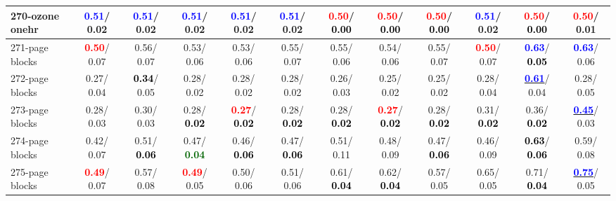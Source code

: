 \begin{table}[h]
\begin{center}
{\begin{tabular}{lc|c|c|c|c|c|c|c|c|c|c}
270-ozone onehr & \textcolor{blue}{\textbf{  0.51}}/  0.02 & \textcolor{blue}{\textbf{  0.51}}/  0.02 & \textcolor{blue}{\textbf{  0.51}}/  0.02 & \textcolor{blue}{\textbf{  0.51}}/  0.02 & \textcolor{blue}{\textbf{  0.51}}/  0.02 & \textcolor{red}{\textbf{  0.50}}/\textcolor{black}{\textbf{  0.00}} & \textcolor{red}{\textbf{  0.50}}/\textcolor{black}{\textbf{  0.00}} & \textcolor{red}{\textbf{  0.50}}/\textcolor{black}{\textbf{  0.00}} & \textcolor{blue}{\textbf{  0.51}}/  0.02 & \textcolor{red}{\textbf{  0.50}}/\textcolor{black}{\textbf{  0.00}} & \textcolor{red}{\textbf{  0.50}}/  0.01 \\ \hline
271-page blocks & \textcolor{red}{\textbf{  0.50}}/  0.07 &   0.56/  0.07 &   0.53/  0.06 &   0.53/  0.06 &   0.55/  0.07 &   0.55/  0.06 &   0.54/  0.06 &   0.55/  0.07 & \textcolor{red}{\textbf{  0.50}}/  0.07 & \textcolor{blue}{\textbf{  0.63}}/\textcolor{black}{\textbf{  0.05}} & \textcolor{blue}{\textbf{  0.63}}/  0.06 \\
272-page blocks &   0.27/  0.04 & \textcolor{black}{\textbf{  0.34}}/  0.05 &   0.28/  0.02 &   0.28/  0.02 &   0.28/  0.02 &   0.26/  0.03 &   0.25/  0.02 &   0.25/  0.02 &   0.28/  0.04 & \underline{\textcolor{blue}{\textbf{  0.61}}}/  0.04 &   0.28/  0.05 \\
273-page blocks &   0.28/  0.03 &   0.30/  0.03 &   0.28/\textcolor{black}{\textbf{  0.02}} & \textcolor{red}{\textbf{  0.27}}/\textcolor{black}{\textbf{  0.02}} &   0.28/\textcolor{black}{\textbf{  0.02}} &   0.28/\textcolor{black}{\textbf{  0.02}} & \textcolor{red}{\textbf{  0.27}}/\textcolor{black}{\textbf{  0.02}} &   0.28/\textcolor{black}{\textbf{  0.02}} &   0.31/\textcolor{black}{\textbf{  0.02}} &   0.36/\textcolor{black}{\textbf{  0.02}} & \underline{\textcolor{blue}{\textbf{  0.45}}}/  0.03 \\
274-page blocks &   0.42/  0.07 &   0.51/\textcolor{black}{\textbf{  0.06}} &   0.47/\textcolor{darkgreen}{\textbf{  0.04}} &   0.46/\textcolor{black}{\textbf{  0.06}} &   0.47/\textcolor{black}{\textbf{  0.06}} &   0.51/  0.11 &   0.48/  0.09 &   0.47/\textcolor{black}{\textbf{  0.06}} &   0.46/  0.09 & \textcolor{black}{\textbf{  0.63}}/\textcolor{black}{\textbf{  0.06}} &   0.59/  0.08 \\
275-page blocks & \textcolor{red}{\textbf{  0.49}}/  0.07 &   0.57/  0.08 & \textcolor{red}{\textbf{  0.49}}/  0.05 &   0.50/  0.06 &   0.51/  0.06 &   0.61/\textcolor{black}{\textbf{  0.04}} &   0.62/\textcolor{black}{\textbf{  0.04}} &   0.57/  0.05 &   0.65/  0.05 &   0.71/\textcolor{black}{\textbf{  0.04}} & \underline{\textcolor{blue}{\textbf{  0.75}}}/  0.05 \\

\end{tabular}}
\end{center}
\end{table}
